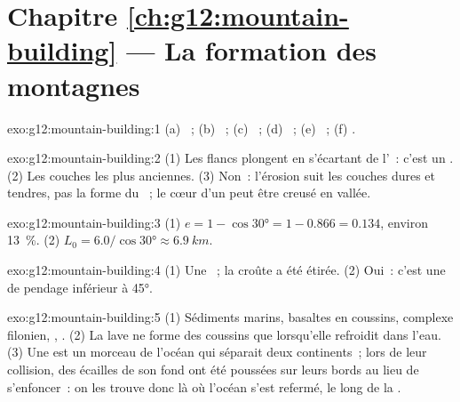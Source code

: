 \section*{Chapitre \ref{ch:g12:mountain-building} --- La formation des montagnes}

\begin{solution}{exo:g12:mountain-building:1}
(a) ~; (b) ~; (c) ~; (d) ~;
(e) ~; (f) .
\end{solution}

\begin{solution}{exo:g12:mountain-building:2}
(1) Les flancs plongent en s'écartant de l'~: c'est un
. (2) Les couches les plus anciennes. (3) Non~: l'érosion suit
les couches dures et tendres, pas la forme du ~; le cœur d'un 
peut être creusé en vallée.
\end{solution}

\begin{solution}{exo:g12:mountain-building:3}
(1) $e = 1 - \cos\ang{30} = 1 - 0.866 = 0.134$, environ \qty{13}{\percent}.
(2) $L_0 = 6.0/\cos\ang{30} \approx \qty{6.9}{km}$.
\end{solution}

\begin{solution}{exo:g12:mountain-building:4}
(1) Une ~; la croûte a été étirée. (2) Oui~: c'est une  de pendage inférieur à \ang{45}.
\end{solution}

\begin{solution}{exo:g12:mountain-building:5}
(1) Sédiments marins, basaltes en coussins, complexe filonien, ,
. (2) La lave ne forme des coussins que lorsqu'elle refroidit dans
l'eau. (3) Une  est un morceau de l'océan qui séparait deux
continents~; lors de leur collision, des écailles de son fond ont été
poussées sur leurs bords au lieu de s'enfoncer~: on les trouve donc là où
l'océan s'est refermé, le long de la .
\end{solution}

